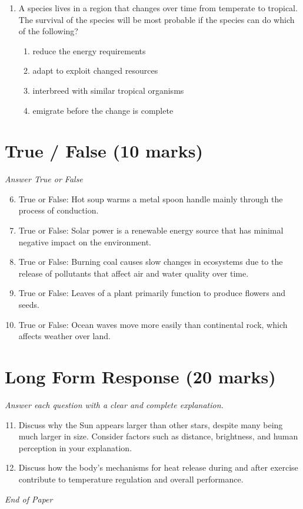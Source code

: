 \documentclass[12pt]{article}
\begin{document}
\begin{enumerate}[label=\arabic*.]
\begin{enumerate}[label=(\alph*)]
\end{enumerate}
\item A species lives in a region that changes over time from temperate to tropical. The survival of the species will be most probable if the species can do which of the following?
\begin{enumerate}[label=(\alph*)]
    \item reduce the energy requirements
    \item adapt to exploit changed resources
    \item interbreed with similar tropical organisms
    \item emigrate before the change is complete
\end{enumerate}
\end{enumerate}

\section*{True / False (10 marks)}
\textit{Answer True or False}
\begin{enumerate}[label=\arabic*.]
\setcounter{enumi}{5}
\item True or False: Hot soup warms a metal spoon handle mainly through the process of conduction.
\item True or False: Solar power is a renewable energy source that has minimal negative impact on the environment.
\item True or False: Burning coal causes slow changes in ecosystems due to the release of pollutants that affect air and water quality over time.
\item True or False: Leaves of a plant primarily function to produce flowers and seeds.
\item True or False: Ocean waves move more easily than continental rock, which affects weather over land.
\end{enumerate}

\section*{Long Form Response (20 marks)}
\textit{Answer each question with a clear and complete explanation.}
\begin{enumerate}[label=\arabic*.]
\setcounter{enumi}{10}
\item Discuss why the Sun appears larger than other stars, despite many being much larger in size. Consider factors such as distance, brightness, and human perception in your explanation.
\item Discuss how the body's mechanisms for heat release during and after exercise contribute to temperature regulation and overall performance.
\end{enumerate}

\vfill
\noindent\textit{End of Paper}
\end{document}

